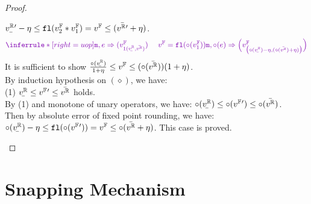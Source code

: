 \documentclass[a4paper,11pt]{article}
\begin{document}
\begin{proof}
\begin{itemize}
	$\ubar{\rval{'}} -  \eta
	\leq \floaten(\fval_2 \bop \fval_1) = \fval
	\leq (\bar{\rval{'}
	}  + \eta)$.
	\caseL
	{
	\[
\extend{
	\inferrule*[right = uop]
	{
		\trsmem, \expr \trsto 
		(\fval_{1(\ubar{\rval}, \bar{\rval})})
		~~~~
		\fval = \floaten(\uop (\fval_1)) 
	}
	{
	    \trsmem, \uop(\expr)
	    \trsto
	    \Big(\fval_
	    {\big(
	     \uop(\ubar{\rval}) - \eta, 
	        (\uop(\bar{\rval}) + \eta)
	        \big)}
	    \Big)
	}
}
	\]
	}
 	It is sufficient to show 
	$\frac{\uop(\ubar{\rval})}{1 + \eta}
	\leq \fval \leq 
	(\uop(\bar{\rval}))(1 + \eta)$.\\
	By induction hypothesis on $(\diamond)$, we have:\\
	(1) $\ubar{\rval} \leq \fval{'} \leq \bar{\rval}$ holds.
	\\
	By (1) and monotone of unary operators, we have:
	$\uop(\ubar{\rval})
	\leq \uop(\fval{'})
	\leq \uop(\bar{\rval})$.\\
	Then by absolute error of fixed point rounding, we have:\\
	$\uop(\ubar{\rval}) -  \eta
	\leq \floaten(\uop(\fval{'})) = \fval
	\leq \uop(\bar{\rval} + \eta)$.
	This case is proved.
\end{itemize}
%
\end{proof}

\newpage
\section{Snapping Mechanism}
\end{document}
